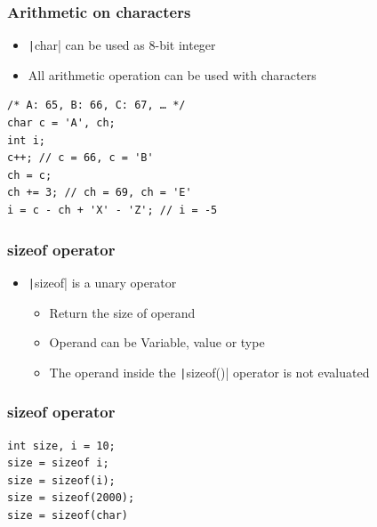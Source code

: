 \documentclass{../c-lecture}
\begin{document}
\begin{frame}[fragile]
  \frametitle{Arithmetic on characters}
  \begin{itemize}
    \item \texttt|char| can be used as 8-bit integer
    \item All arithmetic operation can be used with characters
  \end{itemize}
  \begin{verbatim}
/* A: 65, B: 66, C: 67, … */
char c = 'A', ch;
int i;
c++; // c = 66, c = 'B'
ch = c;
ch += 3; // ch = 69, ch = 'E'
i = c - ch + 'X' - 'Z'; // i = -5
  \end{verbatim}
\end{frame}

\begin{frame}
  \frametitle{sizeof operator}
  \begin{itemize}
    \item \texttt|sizeof| is a unary operator
    \begin{itemize}
      \item Return the size of operand
      \item Operand can be {\color{Cyan} Variable, value or type}
      \item The operand inside the \texttt|sizeof()| operator is not evaluated
    \end{itemize}
  \end{itemize}
\end{frame}

\begin{frame}[fragile]
  \frametitle{sizeof operator}
  \begin{verbatim}
int size, i = 10;
size = sizeof i;
size = sizeof(i);
size = sizeof(2000);
size = sizeof(char)
  \end{verbatim}
\end{frame}
\end{document}
